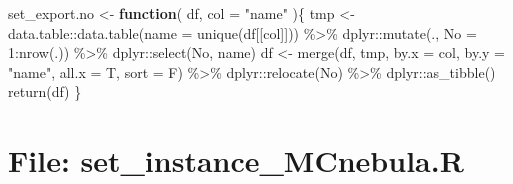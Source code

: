 \documentclass[
]{article}
\newenvironment{Shaded}{\begin{snugshade}}{\end{snugshade}}
\newcommand{\AttributeTok}[1]{\textcolor[rgb]{0.77,0.63,0.00}{#1}}
\newcommand{\ControlFlowTok}[1]{\textcolor[rgb]{0.13,0.29,0.53}{\textbf{#1}}}
\newcommand{\DecValTok}[1]{\textcolor[rgb]{0.00,0.00,0.81}{#1}}
\newcommand{\FunctionTok}[1]{\textcolor[rgb]{0.00,0.00,0.00}{#1}}
\newcommand{\NormalTok}[1]{#1}
\newcommand{\OtherTok}[1]{\textcolor[rgb]{0.56,0.35,0.01}{#1}}
\newcommand{\SpecialCharTok}[1]{\textcolor[rgb]{0.00,0.00,0.00}{#1}}
\newcommand{\StringTok}[1]{\textcolor[rgb]{0.31,0.60,0.02}{#1}}
\begin{document}
\begin{Shaded}
\begin{Highlighting}[]
\NormalTok{set\_export.no }\OtherTok{\textless{}{-}} 
  \ControlFlowTok{function}\NormalTok{(}
\NormalTok{           df,}
           \AttributeTok{col =} \StringTok{"name"}
\NormalTok{           )\{}
\NormalTok{    tmp }\OtherTok{\textless{}{-}}\NormalTok{ data.table}\SpecialCharTok{::}\FunctionTok{data.table}\NormalTok{(}\AttributeTok{name =} \FunctionTok{unique}\NormalTok{(df[[col]])) }\SpecialCharTok{\%\textgreater{}\%} 
\NormalTok{      dplyr}\SpecialCharTok{::}\FunctionTok{mutate}\NormalTok{(., }\AttributeTok{No =} \DecValTok{1}\SpecialCharTok{:}\FunctionTok{nrow}\NormalTok{(.)) }\SpecialCharTok{\%\textgreater{}\%} 
\NormalTok{      dplyr}\SpecialCharTok{::}\FunctionTok{select}\NormalTok{(No, name)}
\NormalTok{    df }\OtherTok{\textless{}{-}} \FunctionTok{merge}\NormalTok{(df, tmp, }\AttributeTok{by.x =}\NormalTok{ col, }\AttributeTok{by.y =} \StringTok{"name"}\NormalTok{, }\AttributeTok{all.x =}\NormalTok{ T, }\AttributeTok{sort =}\NormalTok{ F) }\SpecialCharTok{\%\textgreater{}\%} 
\NormalTok{      dplyr}\SpecialCharTok{::}\FunctionTok{relocate}\NormalTok{(No) }\SpecialCharTok{\%\textgreater{}\%} 
\NormalTok{      dplyr}\SpecialCharTok{::}\FunctionTok{as\_tibble}\NormalTok{()}
    \FunctionTok{return}\NormalTok{(df)}
\NormalTok{  \}}
\end{Highlighting}
\end{Shaded}

\hypertarget{file-set_instance_mcnebula.r}{%
\section{File: set\_instance\_MCnebula.R}\label{file-set_instance_mcnebula.r}}
\end{document}
